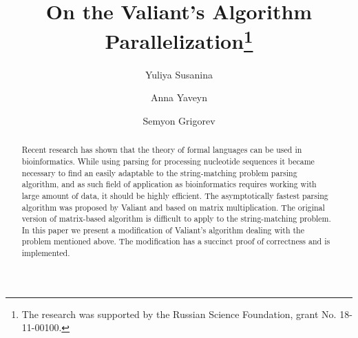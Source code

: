 \documentclass[runningheads]{llncs}
\begin{document}
%
\title{On the Valiant's Algorithm Parallelization\thanks{The research was supported by the Russian Science Foundation, grant No. 18-11-00100.}}
%
%
\author{Yuliya Susanina \and
Anna Yaveyn \and
Semyon Grigorev}
%
%
%
\maketitle              %
%
\begin{abstract}
Recent  research  has  shown  that the theory of formal languages can be used in bioinformatics. While using parsing for processing nucleotide sequences it became necessary to find an easily adaptable to the string-matching problem parsing algorithm, and as such field of application as bioinformatics requires working with large amount of data, it should be highly efficient. The asymptotically fastest parsing algorithm was proposed by Valiant and based on matrix multiplication. The original version of matrix-based algorithm is difficult to apply to the string-matching problem. In this paper we present  a modification  of Valiant's  algorithm dealing with the problem mentioned above. The modification has a succinct proof of correctness and is implemented.

\end{abstract}
%
%
%





\end{document}
